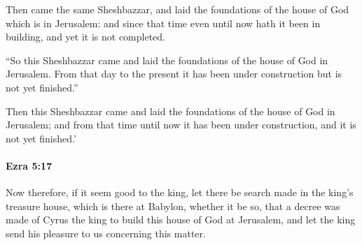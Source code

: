 			\begin{versebox}
					\item[BHS] 
					\item[LXX] 
					\item[ASV] Then came the same Sheshbazzar, and laid the foundations of the house of God which is in Jerusalem: and since that time even until now hath it been in building, and yet it is not completed.
					\item[NIV] “So this Sheshbazzar came and laid the foundations of the house of God in Jerusalem. From that day to the present it has been under construction but is not yet finished.”
					\item[NRSV] Then this Sheshbazzar came and laid the foundations of the house of God in Jerusalem; and from that time until now it has been under construction, and it is not yet finished.’
			\end{versebox}

		\paragraph{Ezra 5:17} %
			\label{EZRA-5-17}

			Now therefore, if it seem good to the king, let there be search made in the king’s treasure house, which is there at Babylon, whether it be so, that a decree was made of Cyrus the king to build this house of God at Jerusalem, and let the king send his pleasure to us concerning this matter.

